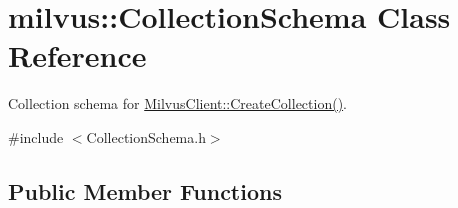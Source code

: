 \hypertarget{classmilvus_1_1_collection_schema}{}\section{milvus\+:\+:Collection\+Schema Class Reference}
\label{classmilvus_1_1_collection_schema}


Collection schema for \hyperlink{classmilvus_1_1_milvus_client_a437b0a97bd9f7789504fdfeab885b5dd}{Milvus\+Client\+::\+Create\+Collection()}.  




{\ttfamily \#include $<$Collection\+Schema.\+h$>$}

\subsection*{Public Member Functions}
